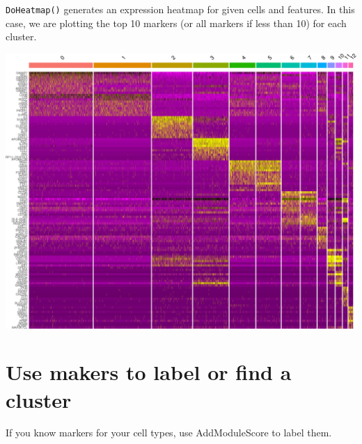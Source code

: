 \documentclass[
]{book}
\newenvironment{Shaded}{\begin{snugshade}}{\end{snugshade}}
\newcommand{\AttributeTok}[1]{\textcolor[rgb]{0.13,0.29,0.53}{#1}}
\newcommand{\DecValTok}[1]{\textcolor[rgb]{0.00,0.00,0.81}{#1}}
\newcommand{\FunctionTok}[1]{\textcolor[rgb]{0.13,0.29,0.53}{\textbf{#1}}}
\newcommand{\NormalTok}[1]{#1}
\newcommand{\OtherTok}[1]{\textcolor[rgb]{0.56,0.35,0.01}{#1}}
\newcommand{\SpecialCharTok}[1]{\textcolor[rgb]{0.81,0.36,0.00}{\textbf{#1}}}
\begin{document}
\texttt{DoHeatmap()} generates an expression heatmap for given cells and features. In this case, we are plotting the top 10 markers (or all markers if less than 10) for each cluster.

\begin{Shaded}
\end{Shaded}

\includegraphics{scRNAseqInR_ABACBS_2024_Doco_files/figure-latex/clusterHeatmap-1.pdf}

\hypertarget{use-makers-to-label-or-find-a-cluster}{%
\section{Use makers to label or find a cluster}\label{use-makers-to-label-or-find-a-cluster}}

If you know markers for your cell types, use AddModuleScore to label them.
\end{document}
